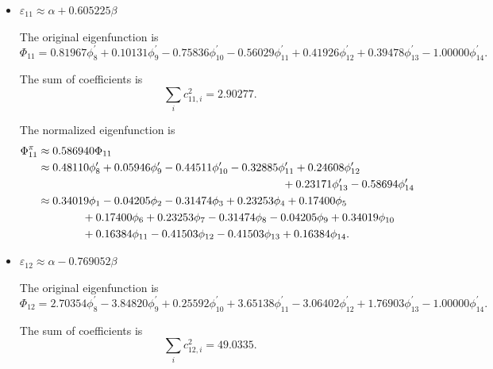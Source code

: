\documentclass[a4paper]{book}
\begin{document}
\begin{solution}
\begin{enumerate}[label=(\alph*)]
\begin{itemize}
		
		\item $\varepsilon_{11} \approx \alpha + 0.605225 \beta$
		
		The original eigenfunction is
		\begin{equation*}
			\Phi_{11} = 0.81967 \phi^\prime_8 + 0.10131  \phi^\prime_9 - 0.75836  \phi^\prime_{10} -0.56029 \phi^\prime_{11} +0.41926 \phi^\prime_{12} +0.39478 \phi^\prime_{13} - 1.00000  \phi^\prime_{14}.
		\end{equation*}
		
		The sum of coefficients is
		\begin{equation*}
			\sum_{i} c^2_{11,i} =  2.90277.
		\end{equation*}
		
		The normalized eigenfunction is		
		\begin{align}
			\Phi^\pi_{11} &\approx 0.586940 \Phi_{11} \notag \\
			&\approx  0.48110 \phi^\prime_8 + 0.05946 \phi^\prime_9 -0.44511 \phi^\prime_{10} -0.32885 \phi^\prime_{11} + 0.24608  \phi^\prime_{12}  \notag\\
			&\hspace*{22em} +0.23171 \phi^\prime_{13} -0.58694 \phi^\prime_{14} \notag \\
			&\approx 0.34019 \phi_1 -0.04205 \phi_2  -0.31474 \phi_3  +0.23253 \phi_4 +0.17400  \phi_5  \notag \\
			&\hspace*{4em} +0.17400  \phi_6  +0.23253  \phi_7 -0.31474 \phi_8  -0.04205 \phi_9 +0.34019 \phi_{10} \notag \\
			&\hspace*{4em} +0.16384 \phi_{11} -0.41503  \phi_{12}   -0.41503 \phi_{13} +0.16384 \phi_{14} .
		\end{align}
		
		
		\item $\varepsilon_{12} \approx \alpha -0.769052 \beta$
		
		The original eigenfunction is
		\begin{equation*}
			\Phi_{12} = 2.70354 \phi^\prime_8 -3.84820 \phi^\prime_9 +0.25592 \phi^\prime_{10} +3.65138 \phi^\prime_{11}  -3.06402 \phi^\prime_{12} +1.76903 \phi^\prime_{13} -1.00000 \phi^\prime_{14}.
		\end{equation*}
		
		The sum of coefficients is
		\begin{equation*}
			\sum_{i} c^2_{12,i} = 49.0335.
		\end{equation*}
		

\end{itemize}
\end{enumerate}
\end{solution}
\end{document}
